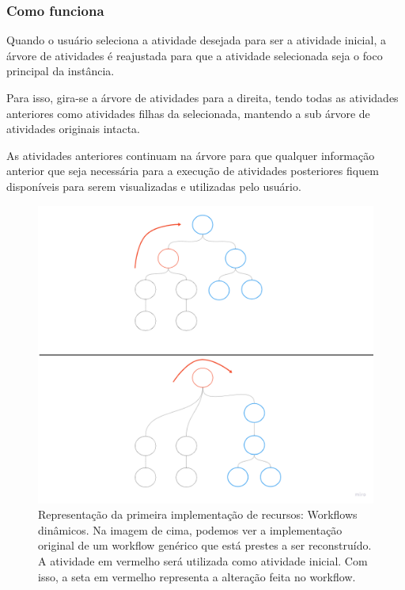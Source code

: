 \subsubsection{Como funciona}

Quando o usuário seleciona a atividade desejada para ser a atividade inicial, a árvore de atividades é reajustada para que a atividade selecionada seja o foco principal da instância.

Para isso, gira-se a árvore de atividades para a direita, tendo todas as atividades anteriores como atividades filhas da selecionada, mantendo a sub árvore de atividades originais intacta.

As atividades anteriores continuam na árvore para que qualquer informação anterior que seja necessária para a execução de atividades posteriores fiquem disponíveis para serem visualizadas e utilizadas pelo usuário.

\begin{figure}
    \centering
    \includegraphics[width=1\textwidth]{imgs/Implementacoes/primeiraImplementacao.png}
    \caption{Representação da primeira implementação de recursos: Workflows dinâmicos. Na imagem de cima, podemos ver a implementação original de um workflow genérico que está prestes a ser reconstruído. A atividade em vermelho será utilizada como atividade inicial. Com isso, a seta em vermelho representa a alteração feita no workflow.}
    \label{fig:primeira_implementacao}
\end{figure}


